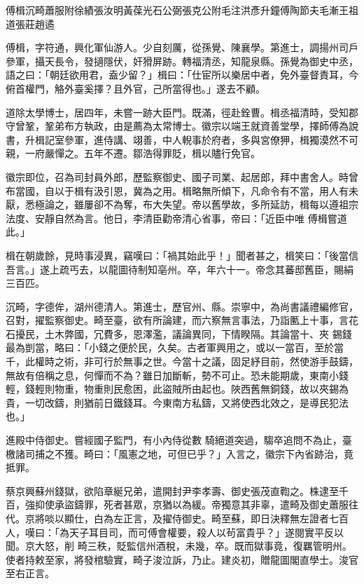 
\begin{pinyinscope}

 傅楫沉畸蕭服附徐績張汝明黃葆光石公弼張克公附毛注洪彥升鐘傅陶節夫毛漸王祖道張莊趙遹



 傅楫，字符通，興化軍仙游人。少自刻厲，從孫覺、陳襄學。第進士，調揚州司戶參軍，攝天長令，發擿隱伏，奸猾屏跡。轉福清丞，知龍泉縣。孫覺為御史中丞，語之曰：「朝廷欲用君，盍少留？」楫曰：「仕宦所以樂居中者，免外臺督責耳，今俯首權門，觡外臺奚擇？且外官，己所當得也。」遂去不顧。



 道除太學博士，居四年，未嘗一跡大臣門。既滿，徑赴銓曹。楫丞福清時，受知郡守曾鞏，鞏弟布方執政，由是薦為太常博士。徽宗以端王就資善堂學，擇師傅為說
 書，升楫記室參軍，進侍講、翊善，中人輗事於府者，多與宮僚狎，楫獨漠然不可親，一府嚴憚之。五年不遷。鄒浩得罪貶，楫以贐行免官。



 徽宗即位，召為司封員外郎，歷監察御史、國子司業、起居郎，拜中書舍人。時曾布當國，自以于楫有汲引恩，冀為之用。楫略無所傾下，凡命令有不當，用人有未厭，悉極論之，雖屢卻不為奪，布大失望。帝以舊學故，多所延訪，楫每以遵祖宗法度、安靜自然為言。他日，李清臣勸帝清心省事，帝曰：「近臣中唯
 傅楫嘗道此。」



 楫在朝歲餘，見時事浸異，竊嘆曰：「禍其始此乎！」聞者甚之，楫笑曰：「後當信吾言。」遂上疏丐去，以龍圖待制知亳州。卒，年六十一。帝念其蕃邸舊臣，賜絹三百匹。



 沉畸，字德侔，湖州德清人。第進士，歷官州、縣。崇寧中，為尚書議禮編修官，召對，擢監察御史。畸至臺，欲有所論建，而六察無言事法，乃詣匭上十事，言花石擾民，土木弊國，冗費多，恩澤濫，議論異同，下情睽隔。其論當十、夾
 錫錢最為剴當，略曰：「小錢之便於民，久矣。古者軍興用之，或以一當百，至於當千，此權時之術，非可行於無事之世。今當十之議，固足紓目前，然使游手鼓鑄，無故有倍稱之息，何憚而不為？雖日加斷斬，勢不可止。恐未能期歲，東南小錢輕，錢輕則物重，物重則民愈困，此盜賊所由起也。陜西舊無銅錢，故以夾錫為貴，一切改鑄，則猶前日鐵錢耳。今東南方私鑄，又將使西北效之，是導民犯法也。」



 進殿中侍御史。嘗經國子監門，有小內侍從數
 騎絕道突過，騶卒追問不為止，臺檄諸司捕之不獲。畸曰：「風憲之地，可但已乎？」入言之，徽宗下內省跡治，竟抵罪。



 蔡京興蘇州錢獄，欲陷章綖兄弟，遣開封尹李孝壽、御史張茂直鞫之。株逮至千百，強抑使承盜鑄罪，死者甚眾，京猶以為緩。帝獨意其非辜，遣畸及御史蕭服往代。京將啖以顯仕，白為左正言，及擢侍御史。畸至蘇，即日決釋無左證者七百人，嘆曰：「為天子耳目司，而可傅會權要，殺人以茍富貴乎？」遂閱實平反以聞。京大怒，削
 畸三秩，貶監信州酒稅，未幾，卒。既而獄事竟，復羈管明州。使者持敕至家，將發棺驗實，畸子浚泣訴，乃止。建炎初，贈龍圖閣直學士。浚官至右正言。




\end{pinyinscope}
